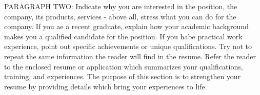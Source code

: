 PARAGRAPH TWO: Indicate why you are interested in the position, the company, its products, services - above all, stress what you can do for the company. If you ae a recent graduate, explain how your academic background makes you a qualified candidate for the position. If you habe practical work experience, point out specific achievements or unique qualifications. Try not to repeat the same information the reader will find in the resume. Refer the reader to the enclosed resume or application which summarizes your qualifications, training, and experiences. The purpose of this section is to strengthen your resume by providing details which bring your experiences to life.